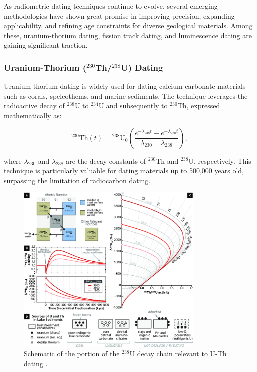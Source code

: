 \documentclass{article}
\begin{document}
As radiometric dating techniques continue to evolve, several emerging methodologies have shown great promise in improving precision, expanding applicability, and refining age constraints for diverse geological materials. Among these, uranium-thorium dating, fission track dating, and luminescence dating are gaining significant traction.  

\subsubsection*{Uranium-Thorium ($^{230}$Th/$^{238}$U) Dating}  
Uranium-thorium dating is widely used for dating calcium carbonate materials such as corals, speleothems, and marine sediments. The technique leverages the radioactive decay of $^{238}$U to $^{234}$U and subsequently to $^{230}$Th, expressed mathematically as:

\begin{equation}
^{230}\text{Th}(t) = {}^{238}\text{U}_0 \left( \frac{e^{-\lambda_{238}t} - e^{-\lambda_{230}t}}{\lambda_{230} - \lambda_{238}} \right),
\end{equation}

where $\lambda_{230}$ and $\lambda_{238}$ are the decay constants of $^{230}$Th and $^{238}$U, respectively. This technique is particularly valuable for dating materials up to 500,000 years old, surpassing the limitation of radiocarbon dating.
\begin{figure}[htbp]
    \centering
    \includegraphics[width=0.8\textwidth]{u_th_dating.png}
    \caption{Schematic of the portion of the $^{238}\text{U}$ decay chain relevant to U-Th dating \cite{UThDatingDiagram}.}
    \label{fig:u_th_dating}
\end{figure}
\end{document}
